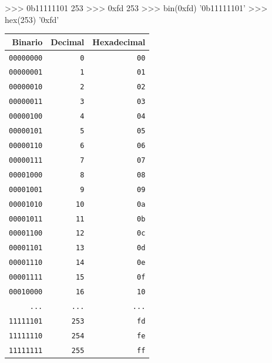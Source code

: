 \begin{sabias_que}
\begin{minipage}{.55\textwidth}
\begin{codigo-python-sn}
>>> 0b11111101
253
>>> 0xfd
253
>>> bin(0xfd)
'0b11111101'
>>> hex(253)
'0xfd'
\end{codigo-python-sn}
\end{minipage}\hfill%
\begin{minipage}{.44\textwidth}
\begin{center}
\begin{tabular}{r r r}
{\bf Binario} & {\bf Decimal} & {\bf Hexadecimal} \\
\hline
\lstinline!00000000! & \lstinline!0! & \lstinline!00! \\
\lstinline!00000001! & \lstinline!1! & \lstinline!01! \\
\lstinline!00000010! & \lstinline!2! & \lstinline!02! \\
\lstinline!00000011! & \lstinline!3! & \lstinline!03! \\
\lstinline!00000100! & \lstinline!4! & \lstinline!04! \\
\lstinline!00000101! & \lstinline!5! & \lstinline!05! \\
\lstinline!00000110! & \lstinline!6! & \lstinline!06! \\
\lstinline!00000111! & \lstinline!7! & \lstinline!07! \\
\lstinline!00001000! & \lstinline!8! & \lstinline!08! \\
\lstinline!00001001! & \lstinline!9! & \lstinline!09! \\
\lstinline!00001010! & \lstinline!10! & \lstinline!0a! \\
\lstinline!00001011! & \lstinline!11! & \lstinline!0b! \\
\lstinline!00001100! & \lstinline!12! & \lstinline!0c! \\
\lstinline!00001101! & \lstinline!13! & \lstinline!0d! \\
\lstinline!00001110! & \lstinline!14! & \lstinline!0e! \\
\lstinline!00001111! & \lstinline!15! & \lstinline!0f! \\
\lstinline!00010000! & \lstinline!16! & \lstinline!10! \\
\lstinline!...!      & \lstinline!...! & \lstinline!...! \\
\lstinline!11111101! & \lstinline!253! & \lstinline!fd! \\
\lstinline!11111110! & \lstinline!254! & \lstinline!fe! \\
\lstinline!11111111! & \lstinline!255! & \lstinline!ff! \\
\end{tabular}
\end{center}
\end{minipage}
\end{sabias_que}

